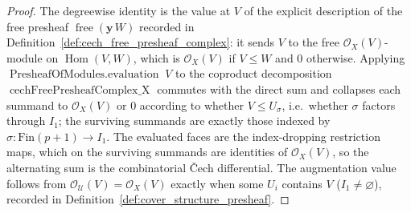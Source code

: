 \begin{proof}
  The degreewise identity is the value at \(V\) of the explicit description of the
  free presheaf \(\operatorname{free}(\mathbf{y}\,W)\) recorded in
  Definition~\ref{def:cech_free_presheaf_complex}: it sends \(V\) to the free
  \(\mathcal{O}_X(V)\)-module on \(\operatorname{Hom}(V, W)\), which is
  \(\mathcal{O}_X(V)\) if \(V \leq W\) and \(0\) otherwise. Applying
  \(\operatorname{PresheafOfModules.evaluation}\;V\) to the coproduct decomposition
  \(\operatorname{cechFreePresheafComplex\_X}\) commutes with the direct sum and
  collapses each summand to \(\mathcal{O}_X(V)\) or \(0\) according to whether
  \(V \leq U_\sigma\), i.e.\ whether \(\sigma\) factors through \(I_1\); the surviving
  summands are exactly those indexed by \(\sigma : \mathrm{Fin}(p+1) \to I_1\). The
  evaluated faces are the index-dropping restriction maps, which on the surviving
  summands are identities of \(\mathcal{O}_X(V)\), so the alternating sum is the
  combinatorial {\v C}ech differential. The augmentation value follows from
  \(\mathcal{O}_{\mathcal{U}}(V) = \mathcal{O}_X(V)\) exactly when some \(U_i\)
  contains \(V\) (\(I_1 \neq \varnothing\)), recorded in
  Definition~\ref{def:cover_structure_presheaf}.
\end{proof}

